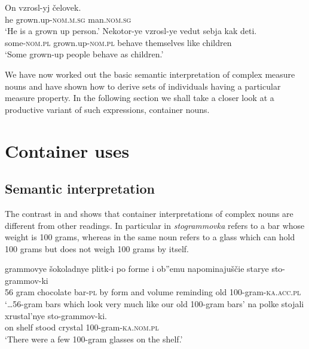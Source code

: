 \documentclass[output=paper]{langscibook}
\begin{document}
\ea\label{ex:khrizmann:19}
    \ea\label{ex:khrizmann:19a} \gll On vzrosl-yj čelovek.\\
    he grown.up-\textsc{nom.m.sg} man.\textsc{nom.sg}\\
    \glt `He is a grown up person.'
    \ex\label{ex:khrizmann:19b} \gll Nekotor-ye vzrosl-ye vedut sebja kak deti.\\
    some-\textsc{nom.pl} grown.up-\textsc{nom.pl} behave themselves like children\\
    \glt `Some grown-up people behave as children.'
\z\z

\noindent We have now worked out the basic semantic interpretation of complex measure nouns and have shown how to derive sets of individuals having a particular measure property. In the following section we shall take a closer look at a productive variant of such expressions, container nouns.

%
%

\section{Container uses}\label{sec:4}
\subsection{Semantic interpretation}\label{sec:4.1}

The contrast in  and  shows that container interpretations of complex nouns are different from other readings. In particular in  \textit{stogrammovka} refers to a bar whose weight is 100 grams, whereas in  the same noun refers to a glass which can hold 100 grams but does not weigh 100 grams by itself.

\ea\label{ex:khrizmann:20}
    \ea\label{ex:khrizmann:20a}  grammovye šokoladnye plitk-i po forme i ob''emu napominajuščie starye sto-grammov-ki\\
    56 gram chocolate bar-\textsc{pl} by form and volume reminding old 100-gram-\textsc{ka.acc.pl}\\
    \glt `\dots 56-gram bars which look very much like our old 100-gram bars'
    \ex\label{ex:khrizmann:20b} \gll na polke stojali xrustal'nye sto-grammov-ki.\\
    on shelf stood crystal 100-gram-\textsc{ka.nom.pl}\\
    \glt `There were a few 100-gram glasses on the shelf.'
\z\z
\end{document}
